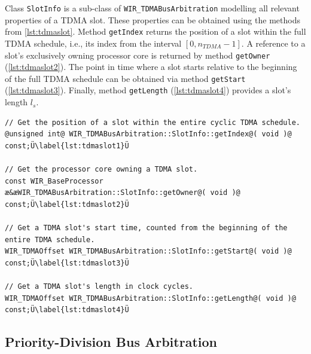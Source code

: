 Class \texttt{SlotInfo} is a sub-class of \texttt{WIR\_TDMABusArbitration} modelling all relevant properties of a \gls{TDMA} slot.
These properties can be obtained using the methods from \cref{lst:tdmaslot}.
Method \texttt{getIndex} returns the position of a slot within the full \gls{TDMA} schedule, i.e., its index from the interval $[0, \mathit{n}_\mathit{TDMA}-1]$.
A reference to a slot's exclusively owning processor core is returned by method \texttt{getOwner} (\cref{lst:tdmaslot2}).
The point in time where a slot starts relative to the beginning of the full \gls{TDMA} schedule can be obtained via method \texttt{getStart} (\cref{lst:tdmaslot3}).
Finally, method \texttt{getLength} (\cref{lst:tdmaslot4}) provides a slot's length $\mathit{l}_\mathit{s}$.

\begin{lstlisting}[style=code,float=t,caption={Characteristic Attributes of Class \texttt{WIR\_TDMABusArbitration::SlotInfo}},label=lst:tdmaslot]
// Get the position of a slot within the entire cyclic TDMA schedule.
@unsigned int@ WIR_TDMABusArbitration::SlotInfo::getIndex@( void )@ const;Ü\label{lst:tdmaslot1}Ü

// Get the processor core owning a TDMA slot.
const WIR_BaseProcessor æ&æWIR_TDMABusArbitration::SlotInfo::getOwner@( void )@ const;Ü\label{lst:tdmaslot2}Ü

// Get a TDMA slot's start time, counted from the beginning of the entire TDMA schedule.
WIR_TDMAOffset WIR_TDMABusArbitration::SlotInfo::getStart@( void )@ const;Ü\label{lst:tdmaslot3}Ü

// Get a TDMA slot's length in clock cycles.
WIR_TDMAOffset WIR_TDMABusArbitration::SlotInfo::getLength@( void )@ const;Ü\label{lst:tdmaslot4}Ü
\end{lstlisting}


\subsection{Priority-Division Bus Arbitration}
\label{ssec:pdarbitration}


